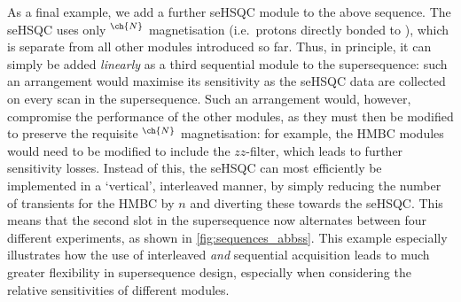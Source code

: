\documentclass[a4paper,12pt]{article}
\newcommand{\nitrogen}{\ch{^{15}N}}
\newcommand{\magn}[1]{\ch{^1H}$^{#1}$}
\begin{document}
\begin{refsection}
As a final example, we add a further \nitrogen{} seHSQC module to the above sequence.
The \nitrogen{} seHSQC uses only \magn{\ch{N}} magnetisation (i.e.\ protons directly bonded to \nitrogen{}), which is separate from all other modules introduced so far.
Thus, in principle, it can simply be added \textit{linearly} as a third sequential module to the supersequence: such an arrangement would maximise its sensitivity as the \nitrogen{} seHSQC data are collected on every scan in the supersequence.
Such an arrangement would, however, compromise the performance of the other modules, as they must then be modified to preserve the requisite \magn{\ch{N}} magnetisation: for example, the HMBC modules would need to be modified to include the $zz$-filter\autocite{Kupce2018CC,Kupce2019JMR}, which leads to further sensitivity losses.
Instead of this, the \nitrogen{} seHSQC can most efficiently be implemented in a `vertical', interleaved manner, by simply reducing the number of transients for the \nitrogen{} HMBC by $n$ and diverting these towards the \nitrogen{} seHSQC.
This means that the second slot in the supersequence now alternates between four different experiments, as shown in \cref{fig:sequences_abbss}.
This example especially illustrates how the use of interleaved \textit{and} sequential acquisition leads to much greater flexibility in supersequence design, especially when considering the relative sensitivities of different modules.


\end{refsection}
\end{document}
